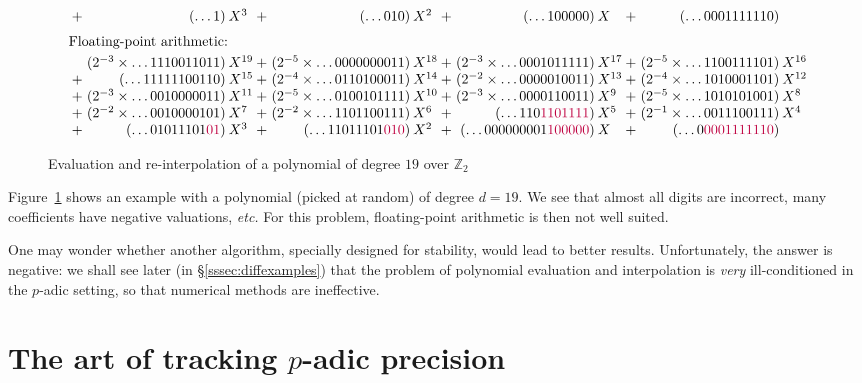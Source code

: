 \documentclass[11pt]{article}
\numberwithin{equation}{section}
\numberwithin{figure}{section}
\theoremstyle{definition}
\newcommand{\Z}{\mathbb Z}
\begin{document}
\begin{figure}
$$\begin{array}{r@{\hspace{0.2ex}}
r@{\hspace{0.5ex}}l@{\hspace{0.2ex}}
r@{\hspace{0.5ex}}l@{\hspace{0.2ex}}
r@{\hspace{0.5ex}}l@{\hspace{0.2ex}}r@{\hspace{0.5ex}}l}
 {}+ {}& (\ldots 1) & X^{3\phantom{0}}
   + {}& (\ldots 010) & X^{2\phantom{0}}
   + {}& (\ldots 100000) & X^{\phantom{01}} 
   + {}& (\ldots 0001111110) \medskip \\
\multicolumn{9}{l}{\text{Floating-point arithmetic:}}\smallskip\\
     {}& (2^{-3} \times \ldots 1110011011) & X^{19}
   + {}& (2^{-5} \times \ldots 0000000011) & X^{18} 
   + {}& (2^{-3} \times \ldots 0001011111) & X^{17} 
   + {}& (2^{-5} \times \ldots 1100111101) & X^{16} \\ 
 {}+ {}& (\ldots 11111100110) & X^{15}
   + {}& (2^{-4} \times \ldots 0110100011) & X^{14} 
   + {}& (2^{-2} \times \ldots 0000010011) & X^{13} 
   + {}& (2^{-4} \times \ldots 1010001101) & X^{12} \\ 
 {}+ {}& (2^{-3} \times \ldots 0010000011) & X^{11}
   + {}& (2^{-5} \times \ldots 0100101111) & X^{10} 
   + {}& (2^{-3} \times \ldots 0000110011) & X^{9\phantom{0}} 
   + {}& (2^{-5} \times \ldots 1010101001) & X^{8} \\ 
 {}+ {}& (2^{-2} \times \ldots 0010000101) & X^{7\phantom{0}}
   + {}& (2^{-2} \times \ldots 1101100111) & X^{6\phantom{0}} 
   + {}& (\ldots 110{\color{purple}1101111}) & X^{5\phantom{0}} 
   + {}& (2^{-1} \times \ldots 0011100111) & X^{4} \\ 
 {}+ {}& (\ldots 01011101{\color{purple}01}) & X^{3\phantom{0}}
   + {}& (\ldots 11011101{\color{purple}010}) & X^{2\phantom{0}} 
   + {}& (\ldots 000000001{\color{purple}100000}) & X^{\phantom{01}}
   + {}& (\ldots 0{\color{purple}0001111110})
\end{array}$$

\caption{Evaluation and re-interpolation of a polynomial of degree $19$
over $\Z_2$}
\label{fig:evalinterpol}
\end{figure}
%
Figure~\ref{fig:evalinterpol} shows an example with a polynomial
(picked at random) of degree $d = 19$. We see that almost all digits
are incorrect, many coefficients have negative valuations, \emph{etc.}
For this problem, floating-point arithmetic is then not well suited.

One may wonder whether another algorithm, specially designed for 
stability, would lead to better results. Unfortunately, the answer is 
negative: we shall see later (in \S \ref{sssec:diffexamples}) that 
the problem of polynomial evaluation and interpolation is \emph{very} 
ill-conditioned in the $p$-adic setting, so that numerical methods are 
ineffective.

\section{The art of tracking $p$-adic precision}
\label{sec:precision}
\end{document}
